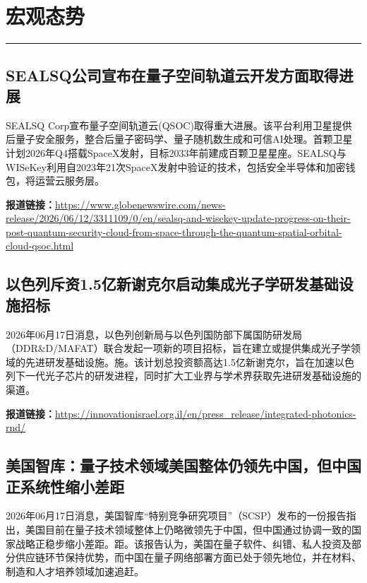 \documentclass[12pt,a4paper]{ctexart}
\begin{document}
\newpage
\section{宏观态势}
\vspace{-0.5em}
\noindent\rule{\linewidth}{1.5pt}

\subsection{ SEALSQ公司宣布在量子空间轨道云开发方面取得进展 }

SEALSQ Corp宣布量子空间轨道云(QSOC)取得重大进展。该平台利用卫星提供后量子安全服务，整合后量子密码学、量子随机数生成和可信AI处理。首颗卫星计划2026年Q4搭载SpaceX发射，目标2033年前建成百颗卫星星座。SEALSQ与WISeKey利用自2023年21次SpaceX发射中验证的技术，包括安全半导体和加密钱包，将运营云服务层。

\noindent\textbf{报道链接：}\url{https://www.globenewswire.com/news-release/2026/06/12/3311109/0/en/sealsq-and-wisekey-update-progress-on-their-post-quantum-security-cloud-from-space-through-the-quantum-spatial-orbital-cloud-qsoc.html}

\subsection{ 以色列斥资1.5亿新谢克尔启动集成光子学研发基础设施招标 }

2026年06月17日消息，以色列创新局与以色列国防部下属国防研发局（DDR\&D/MAFAT）联合发起一项新的项目招标，旨在建立或提供集成光子学领域的先进研发基础设施。施。该计划总投资额高达1.5亿新谢克尔，旨在加速以色列下一代光子芯片的研发进程，同时扩大工业界与学术界获取先进研发基础设施的渠道。

\noindent\textbf{报道链接：}\url{https://innovationisrael.org.il/en/press\_release/integrated-photonics-rnd/}

\subsection{ 美国智库：量子技术领域美国整体仍领先中国，但中国正系统性缩小差距 }

2026年06月17日消息，美国智库“特别竞争研究项目”（SCSP）发布的一份报告指出，美国目前在量子技术领域整体上仍略微领先于中国，但中国通过协调一致的国家战略正稳步缩小差距。距。该报告认为，美国在量子软件、纠错、私人投资及部分供应链环节保持优势，而中国在量子网络部署方面已处于领先地位，并在材料、制造和人才培养领域加速追赶。
\end{document}
